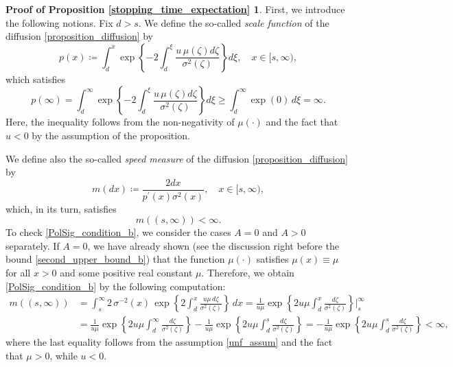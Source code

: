 \documentclass[11pt,tbtags,reqno]{article}
\theoremstyle{definition}
\numberwithin{equation}{section}
\theoremstyle{definition}
\newtheorem*{proof_prop_2}{Proof of Proposition \ref{stopping_time_expectation}}
\begin{document}
\begin{appendices}
\begin{proof_prop_2}
First, we introduce the following notions. Fix $d > s$. We define the so-called \textit{scale function} of the diffusion \eqref{proposition_diffusion} by 
\begin{equation}\label{scale_function}
    p(x) \coloneqq \int_{d}^{x} \exp \left\{-2 \int_{d}^{\xi} \frac{u \, \mu(\zeta) d \zeta}{\sigma^{2}(\zeta)}\right\} d \xi, \quad x \in [s, \infty),
\end{equation}
which satisfies
\begin{equation}\label{PolSig_condition_a}
    p(\infty) = \int_{d}^{\infty} \exp \left\{-2 \int_{d}^{\xi} \frac{u \, \mu(\zeta) d \zeta}{\sigma^{2}(\zeta)}\right\} d \xi \ge \int_{d}^{\infty} \exp(0) \, d\xi = \infty.
\end{equation}
Here, the inequality follows from the non-negativity of $\mu(\cdot)$ and the fact that $u < 0$ by the assumption of the proposition.

We define also the so-called \textit{speed measure} of the diffusion \eqref{proposition_diffusion} by
\begin{equation}\label{speed_measure}
    m(d x) \coloneqq \frac{2 d x}{p^{\prime}(x) \sigma^{2}(x)}, \quad x \in [s, \infty),
\end{equation}
which, in its turn, satisfies 
\begin{equation}\label{PolSig_condition_b}
    m((s, \infty)) < \infty.
\end{equation}
To check \eqref{PolSig_condition_b}, we consider the cases $A = 0$ and $A > 0$ separately. If $A = 0$, we have already shown (see the discussion right before the bound \eqref{second_upper_bound_b}) that the function $\mu(\cdot)$ satisfies $\mu(x) \equiv \mu$ for all $x > 0$ and some positive real constant $\mu$. Therefore, we obtain \eqref{PolSig_condition_b} by the following computation:
\begin{align}\label{full_measure_zero_case}
        m((s, \infty)) &= \int_s^\infty 2\, \sigma^{-2}(x) \, \exp\left\{2 \int_{d}^{x} \frac{u \mu \, d \zeta}{\sigma^{2}(\zeta)}\right\}\, dx
        =
        \frac{1}{u\mu}\exp\left\{2u\mu \int_{d}^{x} \frac{ d \zeta}{\sigma^{2}(\zeta)}\right\} \Bigg|_s^\infty
        \\ &= \frac{1}{u\mu}\exp\left\{2u\mu \int_{d}^{\infty} \frac{ d \zeta}{\sigma^{2}(\zeta)}\right\} - \frac{1}{u\mu}\exp\left\{2u\mu \int_{d}^{s} \frac{ d \zeta}{\sigma^{2}(\zeta)}\right\} 
        = 
        - \frac{1}{u\mu}\exp\left\{2u\mu \int_{d}^{s} \frac{ d \zeta}{\sigma^{2}(\zeta)}\right\} < \infty,
\end{align}
where the last equality follows from the assumption \ref{unf_assum} and the fact that $\mu > 0$, while $u < 0$.


\end{proof_prop_2}
\end{appendices}
\end{document}
